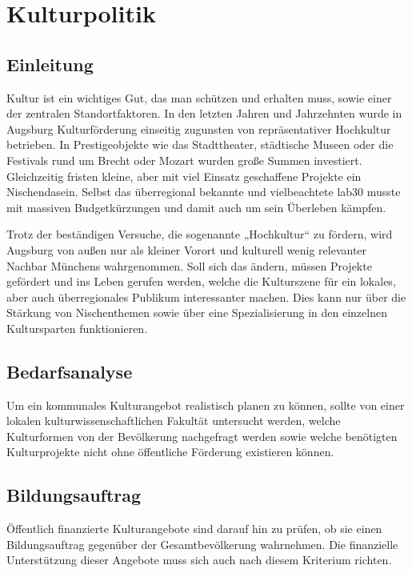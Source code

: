 \documentclass[a5paper, twoside, ngerman, 10pt]{scrbook}
\begin{document}
  \section{Kulturpolitik}
  \subsection{Einleitung}
   
   Kultur ist ein wichtiges Gut, das man schützen und erhalten muss, sowie 
   einer der zentralen Standortfaktoren. In den letzten Jahren und Jahrzehnten 
   wurde in Augsburg Kulturförderung einseitig zugunsten von repräsentativer 
   Hochkultur betrieben. In Prestigeobjekte wie das Stadttheater, städtische 
   Museen oder die Festivals rund um Brecht oder Mozart wurden große Summen 
   investiert. Gleichzeitig fristen kleine, aber mit viel Einsatz geschaffene 
   Projekte ein Nischendasein. Selbst das überregional bekannte und 
   vielbeachtete lab30 musste mit massiven Budgetkürzungen und damit auch um 
   sein Überleben kämpfen.
   
   Trotz der beständigen Versuche, die sogenannte „Hochkultur“ zu fördern, 
   wird Augsburg von außen nur als kleiner Vorort und kulturell wenig 
   relevanter Nachbar Münchens wahrgenommen. Soll sich das ändern, müssen 
   Projekte gefördert und ins Leben gerufen werden, welche die Kulturszene für 
   ein lokales, aber auch überregionales Publikum interessanter machen. Dies 
   kann nur über die Stärkung von Nischenthemen sowie über eine 
   Spezialisierung in den einzelnen Kultursparten funktionieren.
   
   \subsection{Bedarfsanalyse}
   
   Um ein kommunales Kulturangebot realistisch planen zu können, sollte von 
   einer lokalen kulturwissenschaftlichen Fakultät untersucht werden, welche 
   Kulturformen von der Bevölkerung nachgefragt werden sowie welche benötigten 
   Kulturprojekte nicht ohne öffentliche Förderung existieren können.
   
   \subsection{Bildungsauftrag}
   
   Öffentlich finanzierte Kulturangebote sind darauf hin zu prüfen, ob sie 
   einen Bildungsauftrag gegenüber der Gesamtbevölkerung wahrnehmen. Die 
   finanzielle Unterstützung dieser Angebote muss sich auch nach diesem 
   Kriterium richten.
   
\end{document}
